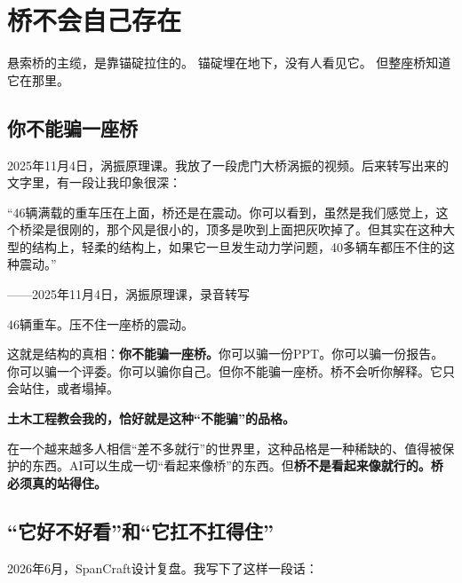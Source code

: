 
\chapter{桥不会自己存在}

\vspace{0.5cm}

\begin{center}
{\small\color{muted} 悬索桥的主缆，是靠锚碇拉住的。}
{\small\color{muted} 锚碇埋在地下，没有人看见它。}
{\small\color{muted} 但整座桥知道它在那里。}
\end{center}

\vspace{1cm}

\section{你不能骗一座桥}

2025年11月4日，涡振原理课。我放了一段虎门大桥涡振的视频。后来转写出来的文字里，有一段让我印象很深：

\begin{shiyu-inline}
``46辆满载的重车压在上面，桥还是在震动。你可以看到，虽然是我们感觉上，这个桥梁是很刚的，那个风是很小的，顶多是吹到上面把灰吹掉了。但其实在这种大型的结构上，轻柔的结构上，如果它一旦发生动力学问题，40多辆车都压不住的这种震动。''

\hfill ——2025年11月4日，涡振原理课，录音转写
\end{shiyu-inline}

46辆重车。压不住一座桥的震动。

这就是结构的真相：\textbf{你不能骗一座桥。}你可以骗一份PPT。你可以骗一份报告。你可以骗一个评委。你可以骗你自己。但你不能骗一座桥。桥不会听你解释。它只会站住，或者塌掉。

\textbf{土木工程教会我的，恰好就是这种``不能骗''的品格。}

在一个越来越多人相信``差不多就行''的世界里，这种品格是一种稀缺的、值得被保护的东西。AI可以生成一切``看起来像桥''的东西。但\textbf{桥不是看起来像就行的。桥必须真的站得住。}

\section{``它好不好看''和``它扛不扛得住''}

2026年6月，SpanCraft设计复盘。我写下了这样一段话：

